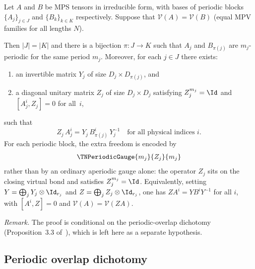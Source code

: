 \begin{theorem}\notready
    \label{thm:periodic_ft}
    Let $A$ and $B$ be MPS tensors in irreducible form,
    with bases of periodic blocks
    $\{A_j\}_{j \in J}$ and $\{B_k\}_{k \in K}$ respectively.
    Suppose that $\mathcal{V}(A) = \mathcal{V}(B)$
    (equal MPV families for all lengths $N$).

    Then $|J| = |K|$ and there is a bijection $\pi : J \to K$
    such that $A_j$ and $B_{\pi(j)}$ are $m_j$-periodic for the same
    period $m_j$.
    Moreover, for each $j \in J$ there exists:
    \begin{enumerate}
        \item an invertible matrix $Y_j$ of size $D_j \times D_{\pi(j)}$,
              and
        \item a diagonal unitary matrix $Z_j$ of size $D_j \times D_j$
              satisfying $Z_j^{m_j} = \Id$ and
              $[A_j^i, Z_j] = 0$ for all~$i$,
    \end{enumerate}
    such that
    \[
        Z_j\, A_j^i = Y_j\, B_{\pi(j)}^i\, Y_j^{-1}
        \quad\text{for all physical indices } i.
    \]
    For each periodic block, the extra freedom is encoded by
    \[
        \TNPeriodicGauge{m_j}{Z_j}{m_j}
    \]
    rather than by an ordinary aperiodic gauge alone: the operator $Z_j$
    sits on the closing virtual bond and satisfies $Z_j^{m_j}=\Id$.
    Equivalently, setting $Y = \bigoplus_j Y_j \otimes \Id_{r_j}$
    and $Z = \bigoplus_j Z_j \otimes \Id_{r_j}$, one has
    $Z A^i = Y B^i Y^{-1}$ for all $i$,
    with $[A^i, Z] = 0$ and $\mathcal{V}(A) = \mathcal{V}(ZA)$.

    \noindent\emph{Remark.}
    The proof is conditional on the periodic-overlap dichotomy
    (Proposition~3.3 of~\cite{DeLasCuevas2017Irreducible}),
    which is left here as a separate hypothesis.
\end{theorem}

\subsection{Periodic overlap dichotomy}

